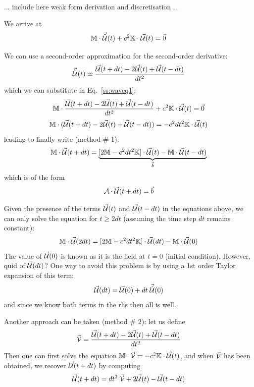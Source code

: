 {\color{red} ... include here weak form derivation and discretisation ... }


We arrive at
\begin{equation}
{\mathbb{M}} \cdot \vec{\ddot{{\cal U}}}(t) + c^2 {\mathbb{K}} \cdot \vec{\cal U}(t) = \vec{0}
\label{ss:waveq1}
\end{equation}

We can use a second-order approximation for the second-order derivative:
\[
\vec{\ddot{{\cal U}}}(t) \simeq  \frac{ \vec{\cal U}(t+dt) -2 \vec{\cal U}(t) + \vec{\cal U}(t-dt)}{dt^2}
\]
which we can substitute in Eq.~\eqref{ss:waveq1}:
\[
{\mathbb{M}} \cdot \frac{ \vec{\cal U}(t+dt) -2 \vec{\cal U}(t) + \vec{\cal U}(t-dt)}{dt^2} 
+c^2 {\mathbb{K}} \cdot \vec{\cal U}(t) = \vec{0}
\]
\[
{\mathbb{M}} \cdot ( \vec{\cal U}(t+dt) -2 \vec{\cal U}(t) + \vec{\cal U}(t-dt)) 
=- c^2 dt^2 {\mathbb{K}} \cdot \vec{\cal U}(t) 
\]
leading to finally write (method \# 1):
\[
{\mathbb{M}} \cdot  \vec{\cal U}(t+dt)
=\underbrace{ [2  {\mathbb{M}}  - c^2 dt^2 {\mathbb{K}}  ]  \cdot \vec{\cal U}(t) - {\mathbb{M}} \cdot \vec{\cal U}(t-dt)}_
{\vec{b}}
\]
which is of the form 
\[
{\cal \bm A} \cdot \vec{\cal U} (t+dt) = \vec{b}
\]

Given the presence of the terms $\vec{\cal U}(t)$ and $\vec{\cal U}(t-dt)$ in the equations above,
we can only solve the equation for $t \ge 2dt$ (assuming the time step $dt$ remains constant):
\[
{\mathbb{M}} \cdot  \vec{\cal U}(2dt)
= [2  {\mathbb{M}}  - c^2 dt^2 {\mathbb{K}}  ]  \cdot \vec{\cal U}(dt) - {\mathbb{M}} \cdot \vec{\cal U}(0)
\]
The value of $\vec{\cal U}(0)$ is known as it is the field at $t=0$ (initial condition). 
However, quid of $\vec{\cal U}(dt)$?
One way to avoid this problem is by using a 1st order Taylor expansion of this term:
\[
\vec{\cal U}(dt) = \vec{\cal U}(0) + dt \; \vec{\dot{{\cal U}}}(0)
\]
and since we know both terms in the rhs then all is well.

\vspace{.6cm}

Another approach can be taken (method \# 2): let us define 
\[
\vec{\cal V}=
\frac{ \vec{\cal U}(t+dt) -2 \vec{\cal U}(t) + \vec{\cal U}(t-dt)}{dt^2} 
\]
Then one can first solve the equation ${\mathbb{M}} \cdot \vec{\cal V}= -c^2 {\mathbb{K}} \cdot \vec{\cal U}(t)$,
and when $\vec{\cal V}$ has been obtained, we recover $\vec{\cal U}(t+dt)$ by computing
\[
\vec{\cal U}(t+dt) = dt^2 \; \vec{\cal V} +2 \vec{\cal U}(t) - \vec{\cal U}(t-dt)
\]

\vspace{.6cm}

